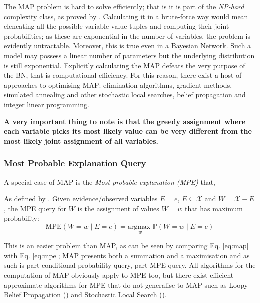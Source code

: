 The MAP problem is hard to solve efficiently; that is it is part of the \textit{NP-hard} complexity class, as proved by \cite{Shimony1994}.
Calculating it in a brute-force way would mean elencating all the possible variable-value tuples and computing their joint probabilities; as these are exponential in the number of variables, the problem is evidently untractable.
Moreover, this is true even in a Bayesian Network.  
Such a model may possess a linear number of parameters but the underlying distribution is still exponential.
Explicitly calculating the MAP defeats the very purpose of the BN, that is computational efficiency.
For this reason, there exist a host of approaches to optimising MAP: elimination algorithms, gradient methods, simulated annealing and other stochastic local searches, belief propagation and integer linear programming.

\textbf{A very important thing to note is that the greedy assignment where each variable picks its most likely value can be very different from the most likely joint assignment of all variables.}

\subsubsection{Most Probable Explanation Query}
A special case of MAP is the \textit{Most probable explanation (MPE)} that, 
\begin{definition}
	As defined by \cite{koller2007introduction}.
 Given evidence/observed variables $E=e$, $E \subseteq \mathcal{X}$ and $W = \mathcal{X} - E$, the MPE query for $W$ is the assignment of values $W=w$ that has maximum probability:
	\begin{equation} \label{eq:mpe}
	\text{MPE}( W=w \mid E=e ) = \underset{w}{\text{argmax }} \mathbb{P}(W=w \mid E=e)
\end{equation}
\end{definition}

This is an easier problem than MAP, as can be seen by comparing Eq. \ref{eq:map} with Eq. \ref{eq:mpe}; MAP presents both a summation and a maximisation and as such is part conditional probability query, part MPE query.
All algorithms for the computation of MAP obviously apply to MPE too, but there exist efficient approximate algorithms for MPE that do not generalise to MAP such as Loopy Belief Propagation (\cite{Pearl1988}) and Stochastic Local Search (\cite{Kask1999}).


